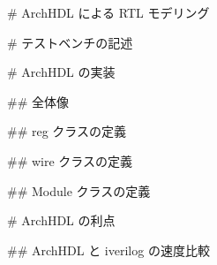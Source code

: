 # ArchHDL による RTL モデリング







# テストベンチの記述






# ArchHDL の実装







## 全体像







## reg クラスの定義





## wire クラスの定義





## Module クラスの定義







# ArchHDL の利点








## ArchHDL と iverilog の速度比較









